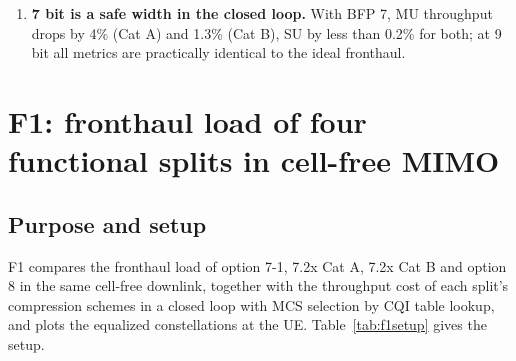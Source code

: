 \documentclass[11pt,a4paper]{article}
\begin{document}
\begin{enumerate}
        189.2 for Cat A). The Cat B layer-domain noise is beamformed together with the signal and gets the same array gain, so
        the transmit-side SQNR reaches the UE almost unchanged; the white antenna-domain noise of Cat A is spread over an
        8-dimensional space, of which only a part falls into the UE's signal subspace, while the signal itself enjoys the
        beamforming gain. The Cat B weights are also compressed to 5 bit in this experiment. With MU, Cat A is more sensitive
        (112.3 vs 153.4 at 5 bit), for the reason given in E1, item 5: antenna-domain noise cannot be nulled by BD and leaks to
        the co-scheduled UE.
  \item \textbf{7 bit is a safe width in the closed loop.} With BFP 7, MU throughput drops by 4\% (Cat A) and 1.3\% (Cat B), SU
        by less than 0.2\% for both; at 9 bit all metrics are practically identical to the ideal fronthaul.
\end{enumerate}

\section{F1: fronthaul load of four functional splits in cell-free MIMO}

\subsection{Purpose and setup}

F1 compares the fronthaul load of option 7-1, 7.2x Cat A, 7.2x Cat B and option 8 in the same cell-free downlink, together with
the throughput cost of each split's compression schemes in a closed loop with MCS selection by CQI table lookup, and plots the
equalized constellations at the UE. Table~\ref{tab:f1setup} gives the setup.
\end{document}
